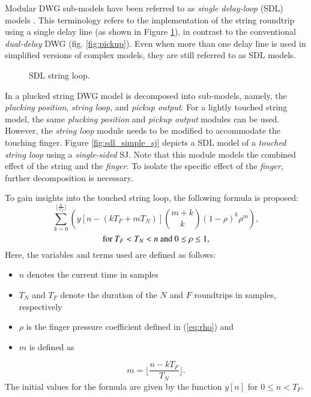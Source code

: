 \documentclass{sigchi}
\begin{document}
Modular DWG sub-models have been referred to as \textit{single delay-loop} (SDL) models \cite{karjalainen_plucked-string_1998,pakarinen_physical_2005}. This terminology refers to the implementation of the string roundtrip using a single delay line (as shown in Figure \ref{fig:sdl_string_loop}), in contrast to the conventional \textit{dual-delay} DWG (fig. \ref{fig:pickup}). Even when more than one delay line is used in simplified versions of complex models, they are still referred to as SDL models.
\begin{figure}[h]
	\centering
	\scalebox{0.75}{}
	\caption{SDL string loop.}
	\label{fig:sdl_string_loop}
\end{figure}
In \cite{karjalainen_plucked-string_1998} a plucked string DWG model is decomposed into sub-models, namely, the \textit{plucking position}, \textit{string loop}, and \textit{pickup output}. For a lightly touched string model, the same \textit{plucking position} and \textit{pickup output} modules can be used. However, the \textit{string loop} module needs to be modified to accommodate the touching finger. Figure \ref{fig:sdl_simple_sj} depicts a SDL model of a \textit{touched string loop} using a \textit{single-sided} SJ. Note that this module models the combined effect of the string and the \textit{finger}. To isolate the specific effect of the \textit{finger}, further decomposition is necessary.
\begin{figure*}[h]
	\centering
	\scalebox{0.8}{}
	\caption{String loop with a scattering junction.}
	\label{fig:sdl_simple_sj}
\end{figure*}
To gain insights into the touched string loop, the following formula is proposed:
\begin{equation} \label{eq:explicit}
	\sum_{k=0}^{\lfloor \frac{n}{T_F} \rfloor}\left(y[n - (kT_F + mT_N)]\binom{m+k}{k} (1 - \rho)^{k} \rho^m\right),
\end{equation}
\begin{equation*}
	\textrm{for } T_F<T_N<n \textrm{ and } 0\leq\rho\leq1\notag,
\end{equation*}
Here, the variables and terms used are defined as follows:
\begin{itemize}
	\item $n$ denotes the current time in samples
	\item $T_N$ and $T_F$ denote the duration of the $N$ and $F$ roundtrips in samples, respectively
	\item $\rho$ is the finger pressure coefficient defined in (\ref{eq:rho}) and
	\item $m$ is defined as
\end{itemize}
\begin{equation}
	m = \lfloor \frac{n - kT_F}{T_N} \rfloor.
\end{equation}
The initial values for the formula are given by the function $y[n]$ for $0 \leq n < T_F$.
\end{document}
